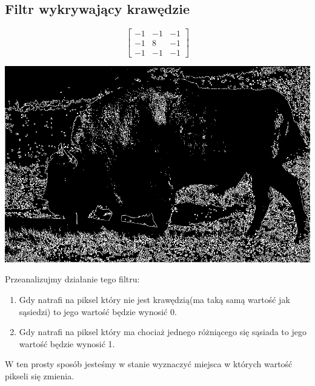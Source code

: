 \documentclass{article}
\begin{document}
	\subsection{Filtr wykrywający krawędzie}
	\begin{equation}
	\begin{bmatrix}
	-1 & -1 & -1 \\
	-1 & 8 & -1 \\
	-1 & -1 & -1 
	\end{bmatrix}
	\end{equation}
	\begin{center}
		\includegraphics[width=\linewidth]{../../lab03/bison_edge.png}
	\end{center}

	Przeanalizujmy działanie tego filtru:
	\begin{enumerate}
		\item Gdy natrafi na piksel który nie jest krawędzią(ma taką samą wartość jak sąsiedzi) to jego wartość będzie wynosić 0.
		
		\item Gdy natrafi na piksel który ma chociaż jednego różniącego się sąsiada to jego wartość będzie wynosić 1.
	\end{enumerate}
	W ten prosty sposób jesteśmy w stanie wyznaczyć miejsca w których wartość pikseli się zmienia.
	
\end{document}
